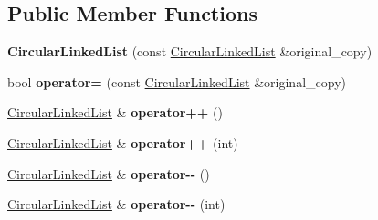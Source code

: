 \subsection*{Public Member Functions}
\begin{DoxyCompactItemize}
\item 
\hypertarget{class_data_structures_1_1_circular_linked_list_a6b8f95081e9afca5094c9169882fa93d}{{\bfseries Circular\-Linked\-List} (const \hyperlink{class_data_structures_1_1_circular_linked_list}{Circular\-Linked\-List} \&original\-\_\-copy)}\label{class_data_structures_1_1_circular_linked_list_a6b8f95081e9afca5094c9169882fa93d}

\item 
\hypertarget{class_data_structures_1_1_circular_linked_list_afb25fbc51ff0ddac711fb4b9e2422b67}{bool {\bfseries operator=} (const \hyperlink{class_data_structures_1_1_circular_linked_list}{Circular\-Linked\-List} \&original\-\_\-copy)}\label{class_data_structures_1_1_circular_linked_list_afb25fbc51ff0ddac711fb4b9e2422b67}

\item 
\hypertarget{class_data_structures_1_1_circular_linked_list_a09cd7f337ea27cb9a2847f78bcef4b6e}{\hyperlink{class_data_structures_1_1_circular_linked_list}{Circular\-Linked\-List} \& {\bfseries operator++} ()}\label{class_data_structures_1_1_circular_linked_list_a09cd7f337ea27cb9a2847f78bcef4b6e}

\item 
\hypertarget{class_data_structures_1_1_circular_linked_list_a03df3f6bbb68d1919d4b0b7406ff89fc}{\hyperlink{class_data_structures_1_1_circular_linked_list}{Circular\-Linked\-List} \& {\bfseries operator++} (int)}\label{class_data_structures_1_1_circular_linked_list_a03df3f6bbb68d1919d4b0b7406ff89fc}

\item 
\hypertarget{class_data_structures_1_1_circular_linked_list_af7346fc2c9e57047dd7225891891e3fa}{\hyperlink{class_data_structures_1_1_circular_linked_list}{Circular\-Linked\-List} \& {\bfseries operator-\/-\/} ()}\label{class_data_structures_1_1_circular_linked_list_af7346fc2c9e57047dd7225891891e3fa}

\item 
\hypertarget{class_data_structures_1_1_circular_linked_list_a94e29b0bdaad70b4de1a768c15d9140c}{\hyperlink{class_data_structures_1_1_circular_linked_list}{Circular\-Linked\-List} \& {\bfseries operator-\/-\/} (int)}\label{class_data_structures_1_1_circular_linked_list_a94e29b0bdaad70b4de1a768c15d9140c}


\end{DoxyCompactItemize}
